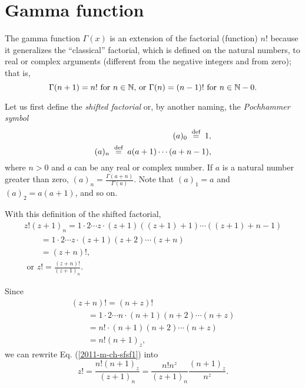 \section{Gamma function}

The gamma function $\Gamma (x)$ is an extension of the factorial (function)  $n!$ because
it generalizes the ``classical'' factorial, which is defined on the natural numbers,
to real or complex arguments (different from the negative integers and from zero); that is,
\begin{equation}
\Gamma (n+1) = n! \textrm { for } n \in {\Bbb N}
\textrm{, or }
\Gamma (n) = (n-1)! \textrm { for } n \in {\Bbb N}-0
.
\label{2011-m-ch-sfgamman}
\end{equation}

Let us first define the
{\em shifted factorial}
or, by another naming,
the
{\em Pochhammer symbol}
\begin{equation}
\begin{split}
(a)_0\stackrel{{\tiny \textrm{ def }}}{=}1,
\\
(a)_n\stackrel{{\tiny \textrm{ def }}}{=}
a(a+1)\cdots (a+n-1)
,
\end{split}
\label{2011-m-ch-sfsf}
\end{equation}
where $n>0$ and $a$ can be any real or complex number.
If $a$ is a natural number greater than zero, $(a)_n=
\frac{\Gamma (a+n)}{\Gamma(a)}$.
Note that
$(a)_1=a$ and $(a)_2=a(a+1)$,
and so on.


With this definition of the shifted factorial,
\begin{equation}
\begin{split}
 z ! ( z +1)_ n
=1\cdot 2 \cdots  z  \cdot ( z +1)(( z +1)+1)\cdots (( z +1)+ n -1)  \\
\qquad
=1\cdot 2 \cdots  z  \cdot ( z +1)(  z +2)\cdots ( z + n ) \\
\qquad
= ( z + n )! ,
\\
\textrm{ or }
 z !
= \frac{( z + n )!}{  ( z +1)_ n }.
\end{split}
\label{2011-m-ch-sfsf1}
\end{equation}

Since
\begin{equation}
\begin{split}
( z + n )!
=( n + z )!     \\
\qquad
= 1\cdot 2 \cdots  n  \cdot ( n +1)( n +2)\cdots ( n + z )   \\
\qquad
=  n ! \cdot ( n +1)( n +2)\cdots ( n + z )   \\
\qquad
= n !( n +1)_ z  ,
\end{split}
\end{equation}
we can rewrite Eq. (\ref{2011-m-ch-sfsf1}) into
\begin{equation}
 z !
= \frac{ n !( n +1)_ z  }{  ( z +1)_ n }
=   \frac{ n !  n ^ z  }{  ( z +1)_ n }  \frac{( n +1)_ z  }{  n ^ z }
.
\label{2011-m-ch-sfsf2}
\end{equation}

